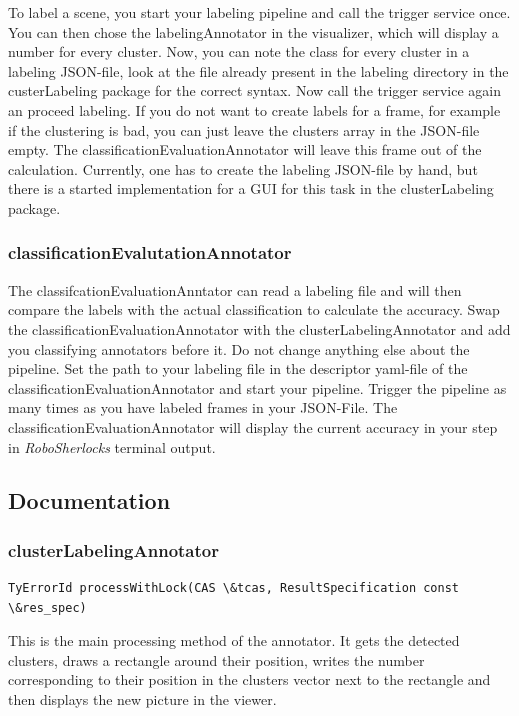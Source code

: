 \documentclass[main.tex]{subfiles}
\begin{document}
To label a scene, you start your labeling pipeline and call the trigger service once. You can then chose the labelingAnnotator in the visualizer, which will display a number for every cluster. Now, you can note the class for every cluster in a labeling JSON-file, look at the file already present in the labeling directory in the custerLabeling package for the correct syntax. Now call the trigger service again an proceed labeling. If you do not want to create labels for a frame, for example if the clustering is bad, you can just leave the clusters array in the JSON-file empty. The classificationEvaluationAnnotator will leave this frame out of the calculation. Currently, one has to create the labeling JSON-file by hand, but there is a started implementation for a GUI for this task in the clusterLabeling package.

\subsubsection{classificationEvalutationAnnotator}
The classifcationEvaluationAnntator can read a labeling file and will then compare the labels with the actual classification to calculate the accuracy. Swap the classificationEvaluationAnnotator with the clusterLabelingAnnotator and add you classifying annotators before it. Do not change anything else about the pipeline. Set the path to your labeling file in the descriptor yaml-file of the classificationEvaluationAnnotator and start your pipeline. Trigger the pipeline as many times as you have labeled frames in your JSON-File. The classificationEvaluationAnnotator will display the current accuracy in your step in \textit{RoboSherlocks} terminal output. 

\subsection{Documentation}
\subsubsection{clusterLabelingAnnotator}
\begin{lstlisting}
TyErrorId processWithLock(CAS \&tcas, ResultSpecification const \&res_spec)
\end{lstlisting}
This is the main processing method of the annotator. It gets the detected clusters, draws a rectangle around their position, writes the number corresponding to their position in the clusters vector next to the rectangle and then displays the new picture in the viewer.
\end{document}
